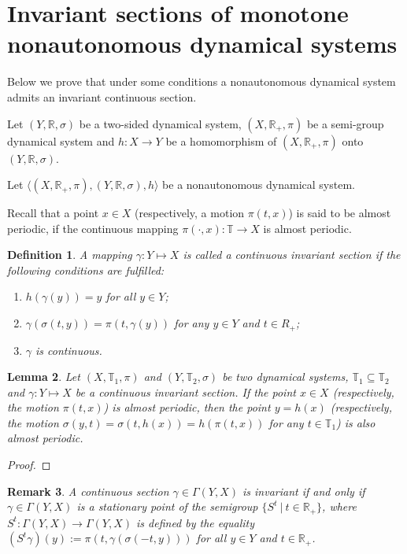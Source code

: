 \documentclass{amsart}%
\newtheorem{lemma}{Lemma}[section]
\newtheorem{remark}[lemma]{Remark}
\newtheorem{definition}[lemma]{Definition}
\begin{document}
\section{Invariant sections of monotone nonautonomous dynamical
systems}


Below we prove that under some conditions a nonautonomous
dynamical system admits an invariant continuous section.

Let $(Y,\mathbb{R},\sigma)$ be a two-sided dynamical system,
$(X,\mathbb{R_{+}}, \pi)$ be a semi-group dynamical system and
$h:X\to Y$ be a homomorphism of $(X,\mathbb{R_{+}},\pi)$ onto
$(Y,\mathbb{R},\sigma)$.

Let $\langle(X,\mathbb{R_{+}},\pi),(Y,\mathbb{R},\sigma),h\rangle$
be a nonautonomous dynamical system.

Recall that a point $x\in X$ (respectively, a motion $\pi(t,x)$) is
said to be almost periodic, if the continuous mapping
$\pi(\cdot,x):\mathbb T\to X$ is almost periodic.

\begin{definition} A mapping $\gamma :Y\mapsto X$ is called a
continuous invariant section if the following conditions are
fulfilled:
\begin{enumerate}
\item $h(\gamma(y))=y$ for all $y\in Y$; \item
$\gamma(\sigma(t,y))=\pi(t,\gamma(y))$ for any $y\in Y$ and $t\in
R_{+}$; \item $\gamma$ is continuous.
\end{enumerate}
\end{definition}

\begin{lemma}\label{lCIS1} Let $(X,\mathbb T_{1},\pi)$ and $(Y,\mathbb T_{2},\sigma)$ be two dynamical systems,
$\mathbb T_{1}\subseteq \mathbb T_{2}$ and $\gamma :Y\mapsto X$ be
a continuous invariant section. If the point $x\in X$
(respectively, the motion $\pi(t,x)$) is almost periodic, then the
point $y=h(x)$ (respectively, the motion
$\sigma(y,t)=\sigma(t,h(x))=h(\pi(t,x))$ for any $t\in \mathbb
T_{1}$) is also almost periodic.
\end{lemma}
\begin{proof}

\end{proof}


\begin{remark}\label{r3.1}
A continuous section $\gamma\in\Gamma(Y,X)$ is invariant if and
only if $\gamma\in\Gamma(Y,X)$ is a stationary point of the
semigroup $\{S^t\ \vert \ t\in \mathbb{R}_{+} \}$, where $S^t:
\Gamma(Y,X)\to \Gamma(Y,X)$ is defined by the equality
$(S^t\gamma)(y):=\pi(t,\gamma(\sigma(-t,y)))$ for all $y\in Y$ and
$t\in \mathbb R_+$.
\end{remark}
\end{document}
